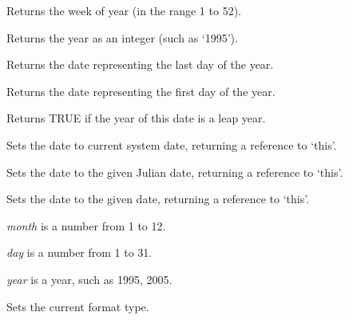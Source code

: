 
Returns the week of year (in the range 1 to 52).

\label{wxdategetyear}


Returns the year as an integer (such as `1995').

\label{wxdategetyearend}


Returns the date representing the last day of the year.

\label{wxdategetyearstart}


Returns the date representing the first day of the year.

\label{wxdateisleapyear}


Returns TRUE if the year of this date is a leap year.

\label{wxdateset}


Sets the date to current system date, returning a reference to `this'.


Sets the date to the given Julian date, returning a reference to `this'.


Sets the date to the given date, returning a reference to `this'.

{\it month} is a number from 1 to 12.

{\it day} is a number from 1 to 31.

{\it year} is a year, such as 1995, 2005.

\label{wxdatesetformat}


Sets the current format type.




